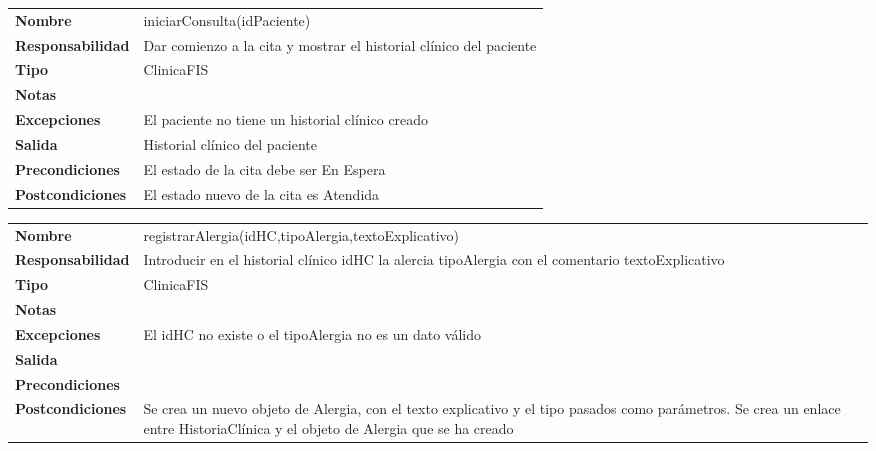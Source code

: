 \begin{table}[H]
\centering
	  \begin{tabularx}{\textwidth}{l|X}
    \textbf{Nombre}        & iniciarConsulta(idPaciente) \\ 
    \textbf{Responsabilidad}  & Dar comienzo a la cita y mostrar el historial clínico del paciente \\ 
    \textbf{Tipo}        &  ClinicaFIS\\ 
    \textbf{Notas}        &  \\ 
    \textbf{Excepciones}    & El paciente no tiene un historial clínico creado \\ 
    \textbf{Salida}        & Historial clínico del paciente \\ 
    \textbf{Precondiciones}    & El estado de la cita debe ser En Espera \\ 
    \textbf{Postcondiciones}  &  El estado nuevo de la cita es Atendida\\ 
  \end{tabularx}

\end{table}


\begin{table}[H]
\centering
	  \begin{tabularx}{\textwidth}{l|X}
    \textbf{Nombre}        & registrarAlergia(idHC,tipoAlergia,textoExplicativo) \\ 
    \textbf{Responsabilidad}  & Introducir en el historial clínico idHC la alercia tipoAlergia con el comentario textoExplicativo \\ 
    \textbf{Tipo}        & ClinicaFIS \\ 
    \textbf{Notas}        &  \\ 
    \textbf{Excepciones}    & El idHC no existe o el tipoAlergia no es un dato válido \\ 
    \textbf{Salida}        &  \\ 
    \textbf{Precondiciones}    &  \\ 
    \textbf{Postcondiciones}  &  Se crea un nuevo objeto de Alergia, con el texto explicativo y el tipo pasados como parámetros.
    Se crea un enlace  entre HistoriaClínica y el objeto de Alergia que se ha creado \\ 
  \end{tabularx}

\end{table}


